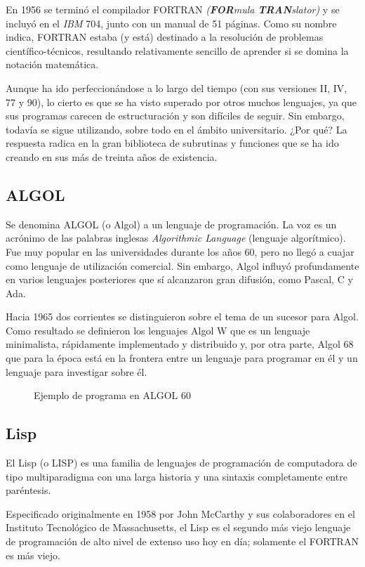 \documentclass[twoside,twocolumn]{article}
\begin{document}
En 1956 se terminó el compilador FORTRAN
\textit{(\textbf{FOR}mula \textbf{TRAN}slator)} y se incluyó en el \textit{IBM} 704,
junto con un manual de 51 páginas.
Como su nombre indica, FORTRAN estaba (y está)
destinado a la resolución de problemas científico-técnicos, resultando relativamente sencillo de aprender si se
domina la notación matemática.

Aunque ha ido perfeccionándose a lo largo del
tiempo (con sus versiones II, IV, 77 y 90), lo cierto es
que se ha visto superado por otros muchos lenguajes,
ya que sus programas carecen de estructuración y son
difíciles de seguir. Sin embargo, todavía se
sigue utilizando, sobre todo en el ámbito universitario.
¿Por qué? La respuesta radica en la gran biblioteca de
subrutinas y funciones que se ha ido creando en sus
más de treinta años de existencia.

\subsection{ALGOL}

Se denomina ALGOL (o Algol) a un lenguaje de programación. La voz es un acrónimo de las palabras inglesas \textit{Algorithmic Language} (lenguaje algorítmico). Fue muy popular en las universidades durante los años 60, pero no llegó a cuajar como lenguaje de utilización comercial. Sin embargo, Algol influyó profundamente en varios lenguajes posteriores que sí alcanzaron gran difusión, como Pascal, C y Ada.

Hacia 1965 dos corrientes se distinguieron sobre el tema de un sucesor para Algol. Como resultado se definieron los lenguajes Algol W que es un lenguaje minimalista, rápidamente implementado y distribuido y, por otra parte, Algol 68 que para la época está en la frontera entre un lenguaje para programar en él y un lenguaje para investigar sobre él.


\begin{figure}[h]
\label{Fig1}
\caption[al.png]{Ejemplo de programa en ALGOL 60 }
\end{figure}

\subsection{Lisp}

El Lisp (o LISP) es una familia de lenguajes de programación de computadora de tipo multiparadigma con una larga historia y una sintaxis completamente entre paréntesis.

Especificado originalmente en 1958 por John McCarthy y sus colaboradores en el Instituto Tecnológico de Massachusetts, el Lisp es el segundo más viejo lenguaje de programación de alto nivel de extenso uso hoy en día; solamente el FORTRAN es más viejo.
\end{document}
